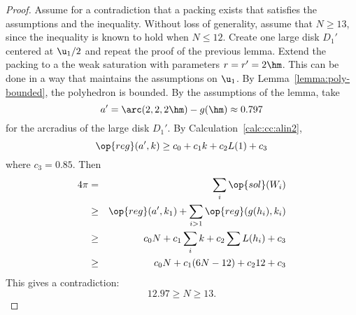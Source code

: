 \begin{proof} Assume for a contradiction that a packing exists that
satisfies the assumptions and the inequality.  Without loss of
generality, assume that $N\ge 13$, since the inequality is known to
hold when $N\le 12$.  Create one large disk $D_1'$ centered at $
\u_1/2$ and repeat the proof of the previous lemma.  Extend the packing to a the weak
saturation with parameters $r=r'=2\hm$.  This can be done in a way that maintains
the assumptions on $\u_1$.  By
Lemma~\ref{lemma:poly-bounded}, the polyhedron is
bounded.  By the assumptions of the lemma, take
\begin{displaymath}a'=\arc(2,2,2\hm)-g(\hm) \approx 0.797\end{displaymath} 
for the arcradius of the large disk $D_1'$.  
By Calculation~\ref{calc:cc:alin2}, %
\begin{equation}\label{eqn:alin2} 
\op{reg}(a',k) \ge c_0 + c_1 k + c_2 L(1) +
c_3\end{equation}
where $c_3 = 0.85$.
Then 
\begin{eqnarray*} 
4\pi &=& \sum_i\op{sol}(W_i)\\
&\ge& \op{reg}(a',k_1)+\sum_{i>1} \op{reg}(g(h_i),k_i) \\
&\ge&  c_0 N +c_1\sum_i k + c_2 \sum L(h_i) + c_3\\
&\ge& c_0 N +c_1 (6N-12) + c_2 12 + c_3\\
\end{eqnarray*}
This gives a contradiction:
\begin{displaymath} 
12.97 \ge N \ge 13.
\end{displaymath}
\end{proof}
